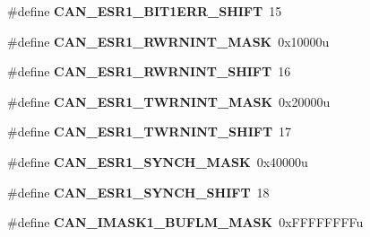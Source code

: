 \begin{DoxyCompactItemize}
\item 
\#define {\bfseries C\+A\+N\+\_\+\+E\+S\+R1\+\_\+\+B\+I\+T1\+E\+R\+R\+\_\+\+S\+H\+I\+FT}~15\hypertarget{group__CAN__Register__Masks_ga2118504746ecc7ba810d5ed44dd7c31f}{}\label{group__CAN__Register__Masks_ga2118504746ecc7ba810d5ed44dd7c31f}

\item 
\#define {\bfseries C\+A\+N\+\_\+\+E\+S\+R1\+\_\+\+R\+W\+R\+N\+I\+N\+T\+\_\+\+M\+A\+SK}~0x10000u\hypertarget{group__CAN__Register__Masks_gaf0e71745a764581c68a93feef2db8602}{}\label{group__CAN__Register__Masks_gaf0e71745a764581c68a93feef2db8602}

\item 
\#define {\bfseries C\+A\+N\+\_\+\+E\+S\+R1\+\_\+\+R\+W\+R\+N\+I\+N\+T\+\_\+\+S\+H\+I\+FT}~16\hypertarget{group__CAN__Register__Masks_gafcbf44277d9766061369a79e2ff761a2}{}\label{group__CAN__Register__Masks_gafcbf44277d9766061369a79e2ff761a2}

\item 
\#define {\bfseries C\+A\+N\+\_\+\+E\+S\+R1\+\_\+\+T\+W\+R\+N\+I\+N\+T\+\_\+\+M\+A\+SK}~0x20000u\hypertarget{group__CAN__Register__Masks_gaf6b96813ed300d4649d7daec40351861}{}\label{group__CAN__Register__Masks_gaf6b96813ed300d4649d7daec40351861}

\item 
\#define {\bfseries C\+A\+N\+\_\+\+E\+S\+R1\+\_\+\+T\+W\+R\+N\+I\+N\+T\+\_\+\+S\+H\+I\+FT}~17\hypertarget{group__CAN__Register__Masks_ga651c6aee47d004060a9dbc10369cf784}{}\label{group__CAN__Register__Masks_ga651c6aee47d004060a9dbc10369cf784}

\item 
\#define {\bfseries C\+A\+N\+\_\+\+E\+S\+R1\+\_\+\+S\+Y\+N\+C\+H\+\_\+\+M\+A\+SK}~0x40000u\hypertarget{group__CAN__Register__Masks_ga908135f00230ede2890a9db408908d34}{}\label{group__CAN__Register__Masks_ga908135f00230ede2890a9db408908d34}

\item 
\#define {\bfseries C\+A\+N\+\_\+\+E\+S\+R1\+\_\+\+S\+Y\+N\+C\+H\+\_\+\+S\+H\+I\+FT}~18\hypertarget{group__CAN__Register__Masks_ga2bd04d8052247b76f7bde4e6d936c0ac}{}\label{group__CAN__Register__Masks_ga2bd04d8052247b76f7bde4e6d936c0ac}

\item 
\#define {\bfseries C\+A\+N\+\_\+\+I\+M\+A\+S\+K1\+\_\+\+B\+U\+F\+L\+M\+\_\+\+M\+A\+SK}~0x\+F\+F\+F\+F\+F\+F\+F\+Fu\hypertarget{group__CAN__Register__Masks_ga1cb2f8a12349b014999ace58cd7600c6}{}\label{group__CAN__Register__Masks_ga1cb2f8a12349b014999ace58cd7600c6}


\end{DoxyCompactItemize}
